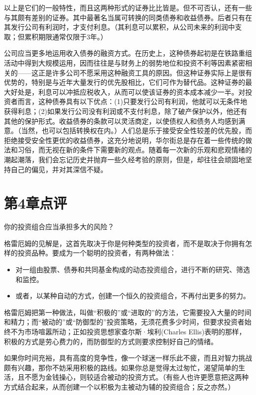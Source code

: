 \documentclass[12pt,oneside]{book}
\begin{document}
以上是它们的一般特性，而且这两种形式的证券比比皆是。但不可否认，还有一些与其颇有差别的证券。其中最著名当属可转换的同类债券和收益债券。后者只有在其发行公司有利润时，才支付利息。（其利息可以累积，从公司未来的利润中支取；但累积期限通常仅限于3年。）

公司应当更多地运用收入债券的融资方式。在历史上，这种债券起初是在铁路重组活动中得到大规模运用，因而往往是与财务上的弱势地位和投资不利等因素紧密相关的——这正是许多公司不愿采用这种融资工具的原因。但这种证券实际上是很有优势的，特别是与近年大量发行的优先股相比，它们可作为替代品。这种证券的最大好处是，利息可以冲抵应税收入，从而可以使该证券的资本成本减少一半。对投资者而言，这种债券具有以下优点：(1)只要发行公司有利润，他就可以无条件地获得利息；(2)如果发行公司没有利润或不支付利息，除了破产保护以外，他还有其他的保护形式。收益债券的条款可以灵活商定，以使债权人和债务人均感到满意。（当然，也可以包括转换权在内。）人们总是乐于接受安全性较差的优先股，而拒绝接受安全性更优的收益债券，这充分地说明，华尔街总是存在着一些传统的做法和习俗，而无视在新的条件下需要新的观点。随着每一次新的乐观和悲观情绪的潮起潮落，我们会忘记历史并抛弃一些久经考验的原则，但是，却往往会顽固地坚持自己的偏见，并对其深信不疑。


\section{第4章点评}
你的投资组合应当承担多大的风险？

格雷厄姆的见解是，这首先取决于你是何种类型的投资者，而不是取决于你拥有怎样的投资品种。要成为一个聪明的投资者，有两种做法：

\begin{itemize}
\item 对一组由股票、债券和共同基金构成的动态投资组合，进行不断的研究、筛选和监控。
\item 或者，以某种自动的方式，创建一个恒久的投资组合，不再付出更多的努力。
\end{itemize}

格雷厄姆把第一种做法，叫做“积极的”或“进取的”的方法，它需要投入大量的时间和精力；而“被动的”或“防御型的”投资策略，无须花费多少时间，但要求投资者始终不为市场喧嚣所动；正如投资思想家查尔斯·埃利(Charles Ellis)表明的那样，积极的方式是劳心费力的，而防御型的方式则要求控制好自己的情绪。

如果你时间充裕，具有高度的竞争性，像一个球迷一样乐此不疲，而且对智力挑战颇有兴趣，那你不妨采用积极的路线。如果你总是觉得太过匆忙，渴望简单的生活，且不愿为金钱操心，则较适合被动的投资方式。（有些人也许更愿意把这两种方式结合起来，从而创建一个以积极为主被动为辅的投资组合；反之亦然。）
\end{document}
